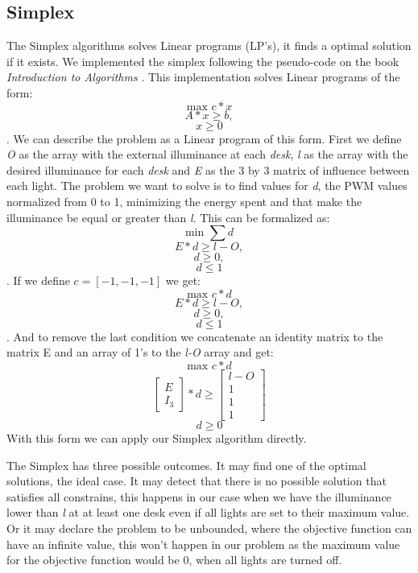 \subsection{Simplex}
\label{sec:Simplex}

The Simplex algorithms solves Linear programs (LP's), it finds a optimal solution if it exists.
We implemented the simplex following the pseudo-code on the book \emph{Introduction to Algorithms} \cite{Cormen}.
This implementation solves Linear programs of the form:
$$ \text{max }c*x $$
$$    A*x \geq b, $$
$$    x \geq 0 $$.
We can describe the problem as a Linear program of this form. First we define \emph{O} as the array with the external illuminance at each \emph{desk}, \emph{l} as the array with the desired illuminance for each \emph{desk} and \emph{E} as the  3 by 3 matrix of influence between each light.
The problem we want to solve is to find values for \emph{d}, the PWM values normalized from 0 to 1,  minimizing the energy spent and that make the illuminance be equal or greater than \emph{l}.
This can be formalized as:
$$ \text{min }\sum{d} $$
$$    E*d \geq l-O, $$
$$    d \geq 0, $$
$$    d \leq 1 $$.
If we define  $c = [-1, -1, -1]$ we get:
$$ \text{max }c*d $$
$$    E*d \geq l-O, $$
$$    d \geq 0, $$
$$    d \leq 1 $$.
And to remove the last condition we concatenate an identity matrix to the matrix E and an array of 1's to the \emph{l-O} array and get:
$$ \text{max }c*d $$
$$
\begin{bmatrix}
    E \\ I_3%
\end{bmatrix}
*d \geq
\begin{bmatrix}
    l-O \\ 1 \\ 1 \\ 1
\end{bmatrix}
$$
$$    d \geq 0 $$
With this form we can apply our Simplex algorithm directly.

The Simplex has three possible outcomes.
It may find one of the optimal solutions, the ideal case.
It may detect that there is no possible solution that satisfies all constrains, this happens in our case when we have the illuminance lower than \emph{l} at at least one desk even if all lights are set to their maximum value.
Or it may declare the problem to be unbounded, where the objective function can have an infinite value, this won't happen in our problem as the maximum value for the objective function would be 0, when all lights are turned off.

